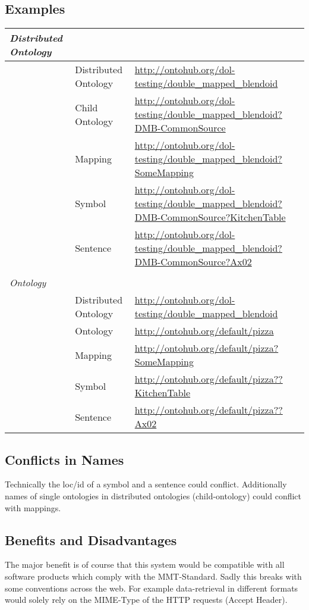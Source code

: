 \documentclass[a4paper,11pt,DIV=25]{scrartcl}
\begin{document}
\subsection{Examples}

\begin{tabularx}{\textwidth}{p{}p{}p{}}
  \textit{Distributed Ontology} & & \\
  \hline
  & Distributed Ontology & \url{http://ontohub.org/dol-testing/double_mapped_blendoid}\\
  & Child Ontology & \url{http://ontohub.org/dol-testing/double_mapped_blendoid?DMB-CommonSource}\\
  & Mapping & \url{http://ontohub.org/dol-testing/double_mapped_blendoid?SomeMapping}\\
  & Symbol & \url{http://ontohub.org/dol-testing/double_mapped_blendoid?DMB-CommonSource?KitchenTable}\\
  & Sentence & \url{http://ontohub.org/dol-testing/double_mapped_blendoid?DMB-CommonSource?Ax02}\\
  & & \\
  \textit{Ontology} & & \\
  \hline
  & Distributed Ontology & \url{http://ontohub.org/dol-testing/double_mapped_blendoid}\\
  & Ontology & \url{http://ontohub.org/default/pizza}\\
  & Mapping & \url{http://ontohub.org/default/pizza?SomeMapping}\\
  & Symbol & \url{http://ontohub.org/default/pizza??KitchenTable}\\
  & Sentence & \url{http://ontohub.org/default/pizza??Ax02}\\
\end{tabularx}

\subsection{Conflicts in Names}

Technically the loc/id of a symbol and a sentence could conflict. Additionally
names of single ontologies in distributed ontologies (child-ontology) could
conflict with mappings.

\subsection{Benefits and Disadvantages}

The major benefit is of course that this system would be compatible with all
software products which comply with the MMT-Standard.  Sadly this breaks with
some conventions across the web. For example data-retrieval in different
formats would solely rely on the MIME-Type of the HTTP requests (Accept
Header).
\end{document}

